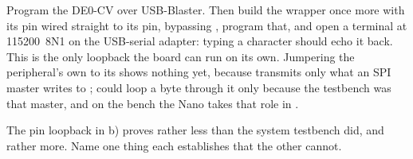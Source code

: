  Program the DE0-CV over USB-Blaster. Then build the wrapper once more with its 
pin wired straight to its  pin, bypassing , program that, and open a terminal
at 115200~8N1 on the USB-serial adapter: typing a character should echo it back. This is the only
loopback the board can run on its own. Jumpering the peripheral's own  to its 
shows nothing yet, because  transmits only what an SPI master writes to
;  could loop a byte through it only because the testbench was that
master, and on the bench the Nano takes that role in .

 The pin loopback in b) proves rather less than the system testbench did, and rather more.
Name one thing each establishes that the other cannot.
